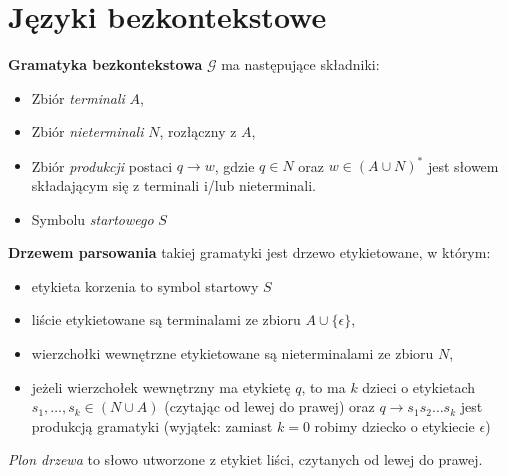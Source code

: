 \section{Języki bezkontekstowe}
\textbf{Gramatyka bezkontekstowa} $\mathcal{G}$ ma następujące składniki:
\begin{itemize}
    \item Zbiór \textit{terminali} $A$,
    \item Zbiór \textit{nieterminali} $N$, rozłączny z $A$,
    \item Zbiór \textit{produkcji} postaci $q \to w$, gdzie $q \in N$ oraz $w \in (A \cup N)^*$
    jest słowem składającym się z terminali i/lub nieterminali.
    \item Symbolu \textit{startowego} $S$
\end{itemize}

\textbf{Drzewem parsowania} takiej gramatyki jest drzewo etykietowane, w którym:
\begin{itemize}
    \item etykieta korzenia to symbol startowy $S$
    \item liście etykietowane są terminalami ze zbioru $A \cup \{ \epsilon \}$,
    \item wierzchołki wewnętrzne etykietowane są nieterminalami ze zbioru $N$,
    \item jeżeli wierzchołek wewnętrzny ma etykietę $q$, to ma $k$ dzieci o etykietach $s_1, \dots, s_k \in (N \cup A)$ (czytając od lewej do prawej) oraz $q \to s_1 s_2 \dots s_k$ jest produkcją gramatyki (wyjątek: zamiast $k = 0$ robimy dziecko o etykiecie $\epsilon$)
\end{itemize}

\textit{Plon drzewa} to słowo utworzone z etykiet liści, czytanych od lewej do prawej.

